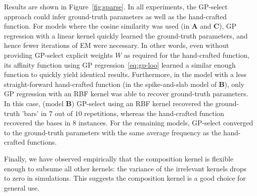 Results are shown in Figure~\ref{fig:sparse}.
In all experiments, the GP-select approach could infer ground-truth parameters as well as the hand-crafted function.
For models where the cosine similarity was used (in \textbf{A} and \textbf{C}), GP regression with a linear kernel quickly learned the ground-truth parameters, and hence fewer iterations of EM were necessary.
In other words, even without providing GP-select explicit weights $W$ as required for the hand-crafted function, its affinity function using GP regression~\eqref{eq:gp-loo} learned a similar enough function to quickly yield identical results.
Furthermore, in the model with a less straight-forward hand-crafted function (in the spike-and-slab model of \textbf{B}), only GP regression with an RBF kernel was able to recover ground-truth parameters.
In this case, (model \textbf{B}) GP-select using an RBF kernel recovered the ground-truth 'bars' in $7$ out of $10$ repetitions, whereas the hand-crafted function recovered the bases in $8$ instances.
For the remaining models, GP-select converged to the ground-truth parameters with the same average frequency as the hand-crafted functions.


Finally, we have observed empirically that the composition kernel is flexible enough to subsume all other kernels:
the variance of the irrelevant kernels drops to zero in simulations.
This suggests the composition kernel is a good choice  for general use. 


